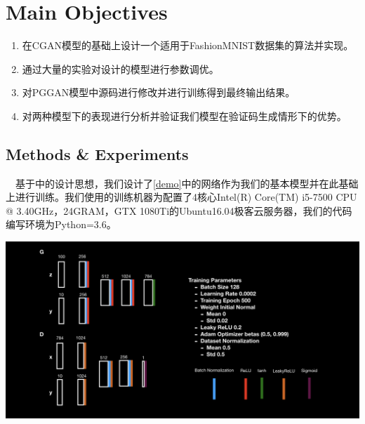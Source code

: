 \documentclass[portrait]{a0poster}
\begin{document}
\begin{multicols}{2}
\section*{Main Objectives}
\begin{CJK}{UTF8}{gbsn}
\begin{enumerate}
\item 在CGAN模型的基础上设计一个适用于FashionMNIST数据集的算法并实现。
\item 通过大量的实验对设计的模型进行参数调优。
\item 对PGGAN模型中源码进行修改并进行训练得到最终输出结果。
\item 对两种模型下的表现进行分析并验证我们模型在验证码生成情形下的优势。
\end{enumerate}
\end{CJK}
\begin{CJK}{UTF8}{gbsn}
\section*{Methods \& Experiments}

\ \ 基于\cite{DBLP:journals/corr/MirzaO14}中的设计思想，我们设计了\ref{demo}中的网络作为我们的基本模型并在此基础上进行训练。我们使用的训练机器为配置了4核心Intel(R) Core(TM) i5-7500 CPU @ 3.40GHz，24GRAM，GTX 1080Ti的Ubuntu16.04极客云服务器，我们的代码编写环境为Python=3.6。
\begin{center}\vspace{1cm}
\includegraphics[width=1.0\linewidth]{demo.jpeg}
\label{demo}
\end{center}\vspace{1cm}


\end{CJK}
\end{multicols}
\end{document}
